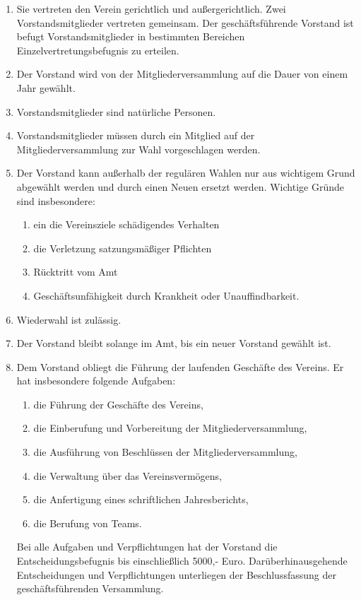 \documentclass[german]{article}
\begin{document}
\begin{enumerate}
\begin{enumerate}
			\item Sie vertreten den Verein gerichtlich und außergerichtlich.
			Zwei Vorstandsmitglieder vertreten gemeinsam. Der geschäftsführende Vorstand ist befugt Vorstandsmitglieder in bestimmten Bereichen Einzelvertretungsbefugnis zu erteilen.
			
			\item Der Vorstand wird von der Mitgliederversammlung auf die Dauer von einem Jahr gewählt.
			
			\item Vorstandsmitglieder sind natürliche Personen.
			
			\item Vorstandsmitglieder müssen durch ein Mitglied auf der Mitgliederversammlung zur Wahl vorgeschlagen werden.
			
			\item Der Vorstand kann außerhalb der regulären Wahlen nur aus wichtigem Grund abgewählt werden und durch einen Neuen ersetzt werden. Wichtige Gründe sind insbesondere:
			\begin{enumerate}
				\item ein die Vereinsziele schädigendes Verhalten
				\item die Verletzung satzungsmäßiger Pflichten
				\item Rücktritt vom Amt
				\item Geschäftsunfähigkeit durch Krankheit oder Unauffindbarkeit.
			\end{enumerate}
			\item Wiederwahl ist zulässig.
			
			\item Der Vorstand bleibt solange im Amt, bis ein neuer Vorstand gewählt ist.
			
			\item Dem Vorstand obliegt die Führung der laufenden Geschäfte des Vereins. Er hat insbesondere folgende Aufgaben:
			\begin{enumerate}
				\item die Führung der Geschäfte des Vereins,
				\item die Einberufung und Vorbereitung der Mitgliederversammlung,
				\item die Ausführung von Beschlüssen der Mitgliederversammlung,
				\item die Verwaltung über das Vereinsvermögens,
				\item die Anfertigung eines schriftlichen Jahresberichts,
				\item die Berufung von Teams.
			\end{enumerate}
			Bei alle Aufgaben und Verpflichtungen hat der Vorstand die Entscheidungsbefugnis bis einschließlich 5000,- Euro. Darüberhinausgehende Entscheidungen und Verpflichtungen unterliegen der Beschlussfassung der geschäftsführenden Versammlung.
			

\end{enumerate}
\end{enumerate}
\end{document}
